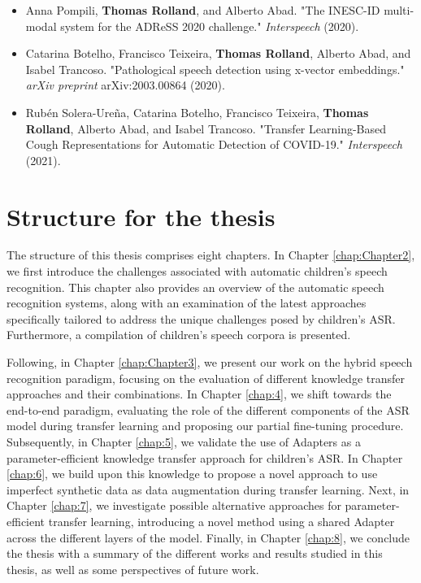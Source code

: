 \begin{itemize}
    \item Anna Pompili, \textbf{Thomas Rolland}, and Alberto Abad. "The INESC-ID multi-modal system for the ADReSS 2020 challenge." \textit{Interspeech} (2020).
    \item Catarina Botelho, Francisco Teixeira, \textbf{Thomas Rolland}, Alberto Abad, and Isabel Trancoso. "Pathological speech detection using x-vector embeddings." \textit{arXiv preprint} arXiv:2003.00864 (2020).
    \item Rubén Solera-Ureña, Catarina Botelho, Francisco Teixeira, \textbf{Thomas Rolland}, Alberto Abad, and Isabel Trancoso. "Transfer Learning-Based Cough Representations for Automatic Detection of COVID-19." \textit{Interspeech} (2021).
\end{itemize}


\section{Structure for the thesis}
The structure of this thesis comprises eight chapters. In Chapter \ref{chap:Chapter2}, we first introduce the challenges associated with automatic children's speech recognition. This chapter also provides an overview of the automatic speech recognition systems, along with an examination of the latest approaches specifically tailored to address the unique challenges posed by children's \ac{ASR}. Furthermore, a compilation of children's speech corpora is presented.

Following, in Chapter \ref{chap:Chapter3}, we present our work on the hybrid speech recognition paradigm, focusing on the evaluation of different knowledge transfer approaches and their combinations. In Chapter \ref{chap:4}, we shift towards the end-to-end paradigm, evaluating the role of the different components of the \ac{ASR} model during transfer learning and proposing our partial fine-tuning procedure. Subsequently, in Chapter \ref{chap:5}, we validate the use of Adapters as a parameter-efficient knowledge transfer approach for children's \ac{ASR}. In Chapter \ref{chap:6}, we build upon this knowledge to propose a novel approach to use imperfect synthetic data as data augmentation during transfer learning.
Next, in Chapter \ref{chap:7}, we investigate possible alternative approaches for parameter-efficient transfer learning, introducing a novel method using a shared Adapter across the different layers of the model. Finally, in Chapter \ref{chap:8}, we conclude the thesis with a summary of the different works and results studied in this thesis, as well as some perspectives of future work. 